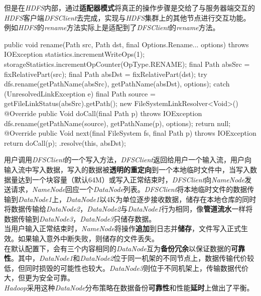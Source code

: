        但是在\textit{HDFS}内部，通过\textbf{适配器模式}将真正的操作步骤是交给了与服务器端交互的\textit{HDFS}客户端\textit{DFSClient}去完成，实现与\textit{HDFS}集群上的其他节点进行交互功能。\\
        例如\textit{HDFS}的\textit{rename}方法实际上是适配到了\textit{DFSClient}的\textit{rename}方法。
        \begin{java}[caption=DistributedFileSystem.rename]
public void rename(Path src, Path dst, final Options.Rename... options) throws IOException {
    statistics.incrementWriteOps(1);
    storageStatistics.incrementOpCounter(OpType.RENAME);
    final Path absSrc = fixRelativePart(src);
    final Path absDst = fixRelativePart(dst);
    try {
        dfs.rename(getPathName(absSrc), getPathName(absDst), options);
    } catch (UnresolvedLinkException e) {
        final Path source = getFileLinkStatus(absSrc).getPath();
        new FileSystemLinkResolver<Void>() {
            @Override
            public Void doCall(final Path p) throws IOException {
                dfs.rename(getPathName(source), getPathName(p), options);
                return null;
            }
            @Override
            public Void next(final FileSystem fs, final Path p) throws IOException {
                return doCall(p);
            }
        }.resolve(this, absDst);
    }
}
        \end{java}
        用户调用\textit{DFSClient}的一个写入方法，\textit{DFSClient}返回给用户一个输入流，用户向输入流中写入数据，写入的数据被\textbf{透明的重定向}到一个本地临时文件中，当写入数据量达到一个块容量（默认64M）或写入正常结束时，\textit{DFSClient}向\textit{NameNode}发送请求，\textit{NameNode}回应一个\textit{DataNode}列表。\textit{DFSClient}将本地临时文件的数据传输到\textit{DataNode1}上，\textit{DataNode1}以4K为单位逐步接收数据，储存在本地仓库的同时将数据传输给\textit{DataNode2}，\textit{DataNode2}与\textit{DataNode1}行为相同，像\textbf{管道流水}一样将数据传输到\textit{DataNode3}，\textit{DataNode3}只储存数据。\\
        当用户输入正常结束时，\textit{NameNode}将操作\textbf{追加}到日志并\textbf{储存}，文件写入正式生效。如果输入意外中断失败，则储存的文件丢失。\\
        在默认配置下，会有三个内容相同的\textit{DataNode}互为\textbf{备份冗余}以保证数据的\textbf{可靠性}。其中，\textit{DataNode1}和\textit{DataNode2}位于同一机架的不同节点上，数据传输代价较低，但同时损毁的可能性也较大。\textit{DataNode3}则位于不同机架上，传输数据代价大，但更为安全可靠。\\
        \textit{Hadoop}采用这种\textit{DataNode}分布策略在数据备份\textbf{可靠性}和性能\textbf{延时}上做出了平衡。
